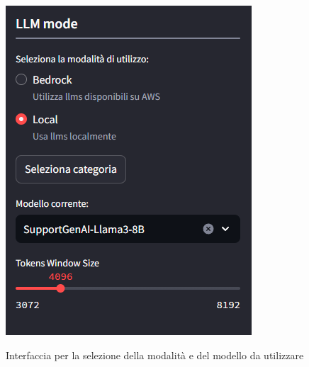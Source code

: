 \begin{figure}[H]
    \centering
    \includegraphics[alt={Interfaccia per la selezione della modalità e del modello}, width=0.5\columnwidth]{img/selectLLMMode.png}
    \caption{Interfaccia per la selezione della modalità e del modello da utilizzare}
    \label{fig:llm_mode}
\end{figure}


